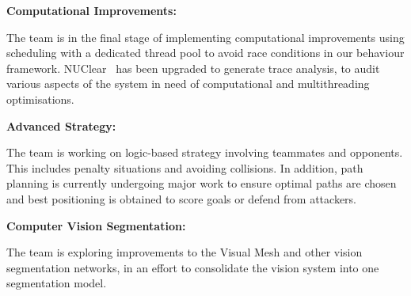 \documentclass{llncs}
\begin{document}
\noindent\textbf{Computational Improvements:} 

The team is in the final stage of implementing computational improvements using scheduling with a dedicated thread pool to avoid race conditions in our behaviour framework. NUClear~\cite{HoulistonEtAl2016} has been upgraded to generate trace analysis, to audit various aspects of the system in need of computational and multithreading optimisations. \newline

\noindent\textbf{Advanced Strategy:}

The team is working on logic-based strategy involving teammates and opponents. This includes penalty situations and avoiding collisions. In addition, path planning is currently undergoing major work to ensure optimal paths are chosen and best positioning is obtained to score goals or defend from attackers.\newline

\noindent\textbf{Computer Vision Segmentation:}

The team is exploring improvements to the Visual Mesh and other vision segmentation networks, in an effort to consolidate the vision system into one segmentation model. 



\end{document}
